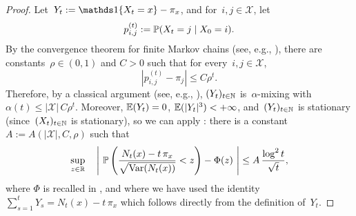 \documentclass{article}
\begin{document}
\begin{proof}
    Let~$Y_t := \bbOne \{ X_t = x \} - \pi_x$, and for~$i,j \in \mathcal{X}$, let
    \begin{equation*}
        p_{i,j}^{(t)} := \operatorname{\mathbb{P}}(X_{t} = j \mid X_0 = i).
    \end{equation*}
    By the convergence theorem for finite Markov chains (see, e.g., \cite[Theorem 8.9]{billingsley_probability_1995}), there are constants~$\rho \in (0,1)$ and $C>0$ such that for every~$i,j \in \mathcal{X}$,
    \begin{equation} \label{eq:convergence_theorem}
        |p_{i,j}^{(t)} - \pi_j| \leq C \rho^t.
    \end{equation}
    Therefore, by a classical argument (see, e.g., \cite[Example 27.6]{billingsley_probability_1995}), $(Y_t)_{t \in \operatorname{\mathbb{N}}}$ is~$\alpha$-mixing with~$\alpha(t) \leq |\mathcal{X}| \, C \rho^t$.
    Moreover, $\operatorname{\mathbb{E}}(Y_t) = 0$, $\operatorname{\mathbb{E}}(|Y_t|^3) < +\infty$, and~$(Y_t)_{t \in \operatorname{\mathbb{N}}}$ is stationary (since~$(X_t)_{t \in \operatorname{\mathbb{N}}}$ is stationary), so we can apply : there is a constant~$A := A(|\mathcal{X}|,C,\rho)$ such that
    \begin{equation} \label{eq:applied_berry_esseen}
        \sup_{z \in \operatorname{\mathbb{R}}} \quad \left| ~ \operatorname{\mathbb{P}}\left( \frac{N_t(x) - t \, \pi_x}{\sqrt{\mathrm{Var}(N_t(x))}} < z \right) - \Phi(z) ~ \right| \leq A \, \frac{\log^2 t}{\sqrt{t}},
    \end{equation}
    where $\Phi$ is recalled in ,
    and where we have used the identity~$\sum_{s=1}^t Y_s = N_t(x) - t \, \pi_x$ which follows directly from the definition of~$Y_t$. 
    

\end{proof}
\end{document}
